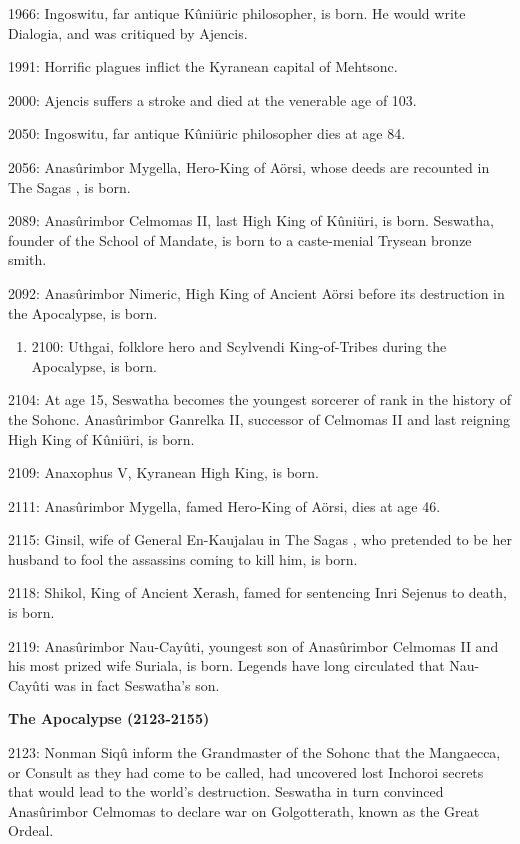 \documentclass[]{book}
\providecommand{\tightlist}{%
  \setlength{\itemsep}{0pt}\setlength{\parskip}{0pt}}
\begin{document}
1966: Ingoswitu, far antique Kûniüric philosopher, is born. He would write Dialogia, and was critiqued by Ajencis.

1991: Horrific plagues inflict the Kyranean capital of Mehtsonc.

2000: Ajencis suffers a stroke and died at the venerable age of 103.

2050: Ingoswitu, far antique Kûniüric philosopher dies at age 84.

2056: Anasûrimbor Mygella, Hero-King of Aörsi, whose deeds are recounted in The Sagas , is born.

2089: Anasûrimbor Celmomas II, last High King of Kûniüri, is born. Seswatha, founder of the School of Mandate, is born to a caste-menial Trysean bronze smith.

2092: Anasûrimbor Nimeric, High King of Ancient Aörsi before its destruction in the Apocalypse, is born.

\begin{enumerate}
\def\labelenumi{\alph{enumi}.}
\setcounter{enumi}{2}
\tightlist
\item
  2100: Uthgai, folklore hero and Scylvendi King-of-Tribes during the Apocalypse,
  is born.
\end{enumerate}

2104: At age 15, Seswatha becomes the youngest sorcerer of rank in the history of the
Sohonc. Anasûrimbor Ganrelka II, successor of Celmomas II and last reigning High King of Kûniüri, is born.

2109: Anaxophus V, Kyranean High King, is born.

2111: Anasûrimbor Mygella, famed Hero-King of Aörsi, dies at age 46.

2115: Ginsil, wife of General En-Kaujalau in The Sagas , who pretended to be her
husband to fool the assassins coming to kill him, is born.

2118: Shikol, King of Ancient Xerash, famed for sentencing Inri Sejenus to death, is
born.

2119: Anasûrimbor Nau-Cayûti, youngest son of Anasûrimbor Celmomas II and his
most prized wife Suriala, is born. Legends have long circulated that Nau-Cayûti
was in fact Seswatha's son.

\textbf{The Apocalypse (2123-2155)}

2123: Nonman Siqû inform the Grandmaster of the Sohonc that the Mangaecca,
or Consult as they had come to be called, had uncovered lost Inchoroi secrets
that would lead to the world's destruction. Seswatha in turn convinced
Anasûrimbor Celmomas to declare war on Golgotterath, known as the Great
Ordeal.
\end{document}
